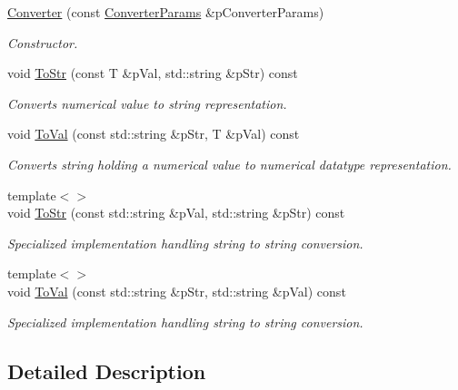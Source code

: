 \begin{DoxyCompactItemize}
\item 
\hyperlink{classrapidcsv_1_1Converter_a8f7de9557f32e24abb022bc9d52ae2e2}{Converter} (const \hyperlink{structrapidcsv_1_1ConverterParams}{Converter\+Params} \&p\+Converter\+Params)
\begin{DoxyCompactList}\small\item\em Constructor. \end{DoxyCompactList}\item 
void \hyperlink{classrapidcsv_1_1Converter_a114b87c39563c7777ad79fa8eb50c8e5}{To\+Str} (const T \&p\+Val, std\+::string \&p\+Str) const
\begin{DoxyCompactList}\small\item\em Converts numerical value to string representation. \end{DoxyCompactList}\item 
void \hyperlink{classrapidcsv_1_1Converter_a827c54e8cbe86cdb8e315d3382dfcbba}{To\+Val} (const std\+::string \&p\+Str, T \&p\+Val) const
\begin{DoxyCompactList}\small\item\em Converts string holding a numerical value to numerical datatype representation. \end{DoxyCompactList}\item 
{\footnotesize template$<$$>$ }\\void \hyperlink{classrapidcsv_1_1Converter_ae3c2d87f4e7cb9d09d4ecdd23419449c}{To\+Str} (const std\+::string \&p\+Val, std\+::string \&p\+Str) const
\begin{DoxyCompactList}\small\item\em Specialized implementation handling string to string conversion. \end{DoxyCompactList}\item 
{\footnotesize template$<$$>$ }\\void \hyperlink{classrapidcsv_1_1Converter_aa038d308c460903344c0c2ebc5251537}{To\+Val} (const std\+::string \&p\+Str, std\+::string \&p\+Val) const
\begin{DoxyCompactList}\small\item\em Specialized implementation handling string to string conversion. \end{DoxyCompactList}\end{DoxyCompactItemize}


\subsection{Detailed Description}
